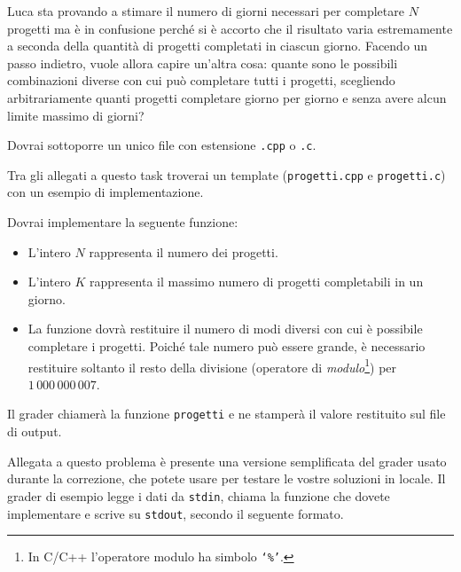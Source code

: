 Luca sta provando a stimare il numero di giorni necessari per completare $N$ progetti ma è in confusione perché si è accorto che il risultato varia estremamente a seconda della quantità di progetti completati in ciascun giorno. Facendo un passo indietro, vuole allora capire un'altra cosa: quante sono le possibili combinazioni diverse con cui può completare tutti i progetti, scegliendo arbitrariamente quanti progetti completare giorno per giorno e senza avere alcun limite massimo di giorni?

\Implementation
Dovrai sottoporre un unico file con estensione \texttt{.cpp} o \texttt{.c}.

\begin{warning}
Tra gli allegati a questo task troverai un template (\texttt{progetti.cpp} e \texttt{progetti.c}) con un esempio di implementazione.
\end{warning}

\pagebreak

Dovrai implementare la seguente funzione:

\begin{itemize}[nolistsep]

    \begin{itemize}[nolistsep]
        \item L'intero $N$ rappresenta il numero dei progetti.
        \item L'intero $K$ rappresenta il massimo numero di progetti completabili in un giorno.
        \item La funzione dovrà restituire il numero di modi diversi con cui è possibile completare i progetti. Poiché tale numero può essere grande, è necessario restituire soltanto il resto della divisione (operatore di \emph{modulo}\footnote{In C/C++ l'operatore modulo ha simbolo \texttt{`\%'}.}) per $1\,000\,000\,007$.

    \end{itemize}
\end{itemize}

Il grader chiamerà la funzione \texttt{progetti} e ne stamperà il valore restituito sul file di output.



\Grader
Allegata a questo problema è presente una versione semplificata del grader usato durante la correzione, che potete usare per testare le vostre soluzioni in locale. Il grader di esempio legge i dati da \texttt{stdin}, chiama la funzione che dovete implementare e scrive su \texttt{stdout}, secondo il seguente formato.

